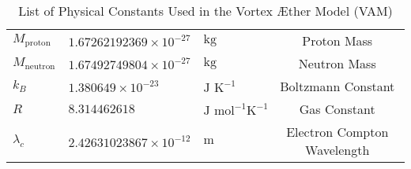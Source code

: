 \begin{table}[htbp]
\begin{tabular}{lllc}
            $M_{\text{proton}}$ & $1.67262192369 \times 10^{-27}$ & $\text{kg}$ & Proton Mass \\
            $M_{\text{neutron}}$ & $1.67492749804 \times 10^{-27}$ & $\text{kg}$ & Neutron Mass \\
            $k_B$ & $1.380649 \times 10^{-23}$ & $\text{J K}^{-1}$ & Boltzmann Constant \\
            $R$ & $8.314462618$ & $\text{J mol}^{-1} \text{K}^{-1}$ & Gas Constant \\
            $\lambda_c$ & $2.42631023867 \times 10^{-12}$ & $\text{m}$ & Electron Compton Wavelength \\
            \bottomrule
        \end{tabular}
        \caption{List of Physical Constants Used in the Vortex Æther Model (VAM)}
        \label{tab:vam_constants}
    \end{table}




